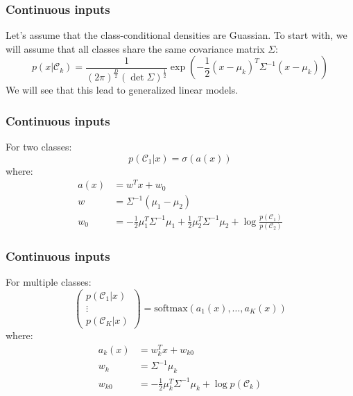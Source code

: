 \documentclass{beamer}
\begin{document}
\begin{frame}
    \frametitle{Continuous inputs}
    Let's assume that the class-conditional densities are Guassian. To start with, we will assume that all classes share the same covariance matrix $\Sigma$:
    \begin{equation*}
        p(x|\mathcal{C}_{k})=\frac{1}{(2\pi)^{\frac{D}{2}}(\det\Sigma)^{\frac{1}{2}}}\exp(-\frac{1}{2}(x-\mu_{k})^{T}\Sigma^{-1}(x-\mu_{k}))
    \end{equation*}
    We will see that this lead to generalized linear models.
\end{frame}

\begin{frame}
    \frametitle{Continuous inputs}
    For two classes:
    \begin{equation*}
        p(\mathcal{C}_{1}|x)=\sigma(a(x))
    \end{equation*}
    where:
    \begin{align*}
        a(x)&=w^{T}x+w_{0} \\
        w&=\Sigma^{-1}(\mu_{1}-\mu_{2}) \\
        w_{0}&=-\frac{1}{2}\mu_{1}^{T}\Sigma^{-1}\mu_{1}+\frac{1}{2}\mu_{2}^{T}\Sigma^{-1}\mu_{2}+\log\frac{p(\mathcal{C}_{1})}{p(\mathcal{C}_{2})}
    \end{align*}
\end{frame}

\begin{frame}
    \frametitle{Continuous inputs}
    For multiple classes:
    \begin{equation*}
        \begin{pmatrix}
            p(\mathcal{C}_{1}|x) \\
            \vdots \\
            p(\mathcal{C}_{K}|x)
        \end{pmatrix}
        =\mathrm{softmax}(a_{1}(x),\hdots,a_{K}(x))
    \end{equation*}
    where:
    \begin{align*}
        a_{k}(x)&=w_{k}^{T}x+w_{k0} \\
        w_{k}&=\Sigma^{-1}\mu_{k} \\
        w_{k0}&=-\frac{1}{2}\mu_{k}^{T}\Sigma^{-1}\mu_{k}+\log{}p(\mathcal{C}_{k})
    \end{align*}
\end{frame}
\end{document}
